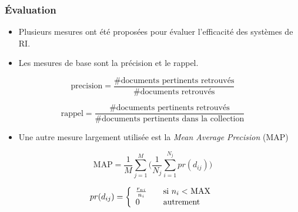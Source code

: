 \documentclass[12pt,aspectratio=43,dvipsnames,table]{beamer}
\begin{document}
\begin{frame}[allowframebreaks]
    \frametitle{\'Evaluation}
    \begin{itemize} \itemsep10pt
        \item Plusieurs mesures ont été proposées pour évaluer l'efficacité des
              systèmes de RI.
        \item Les mesures de base sont la précision et le rappel.
    \end{itemize}

    \begin{equation}
      \text{precision} = \frac{\text{\# documents pertinents retrouvés}}
                              {\text{\# documents retrouvés}}
    \end{equation}

    \begin{equation}
      \text{rappel} = \frac{\text{\# documents pertinents retrouvés}}
                           {\text{\# documents pertinents dans la collection}}
    \end{equation}

    \framebreak

    \begin{itemize} \itemsep10pt
        \item Une autre mesure largement utilisée est la \textit{Mean Average 
              Precision} (MAP)
    \end{itemize}

    \begin{equation}
      \text{MAP} = \frac{1}{M} \sum_{j=1}^{M} \Bigg( 
                     \frac{1}{N_j} \sum_{i=1}^{N_j} pr(d_{ij})
                   \Bigg)
    \end{equation}

    \begin{equation}
      pr(d_{ij}) = \left\{ 
        \begin{array}{l l}
          \frac{r_{ni}}{n_i} & \quad \text{si $n_i <$ MAX}\\
          0 & \quad \text{autrement}
        \end{array} \right.
    \end{equation}



\end{frame}


\end{document}
